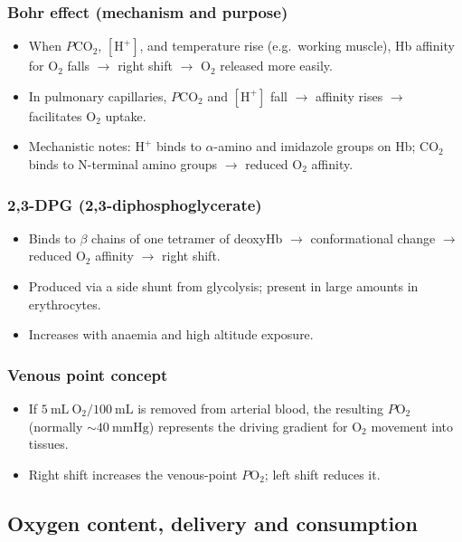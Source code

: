 \documentclass[11pt,a4paper]{article}
\begin{document}
\subsubsection{Bohr effect (mechanism and purpose)}
\begin{itemize}
  \item When \(P\mathrm{CO}_2\), \([\mathrm{H}^+]\), and temperature rise (e.g.\ working muscle), Hb affinity for O\(_2\) falls \(\rightarrow\) right shift \(\rightarrow\) O\(_2\) released more easily.
  \item In pulmonary capillaries, \(P\mathrm{CO}_2\) and \([\mathrm{H}^+]\) fall \(\rightarrow\) affinity rises \(\rightarrow\) facilitates O\(_2\) uptake.
  \item Mechanistic notes: \(\mathrm{H}^+\) binds to \(\alpha\)-amino and imidazole groups on Hb; CO\(_2\) binds to N-terminal amino groups \(\rightarrow\) reduced O\(_2\) affinity.
\end{itemize}

\subsubsection{2,3-DPG (2,3-diphosphoglycerate)}
\begin{itemize}
  \item Binds to \(\beta\) chains of one tetramer of deoxyHb \(\rightarrow\) conformational change \(\rightarrow\) reduced O\(_2\) affinity \(\rightarrow\) right shift.
  \item Produced via a side shunt from glycolysis; present in large amounts in erythrocytes.
  \item Increases with anaemia and high altitude exposure.
\end{itemize}

\subsubsection{Venous point concept}
\begin{itemize}
  \item If \(5~\mathrm{mL~O_2}/100~\mathrm{mL}\) is removed from arterial blood, the resulting \(P\mathrm{O}_2\) (normally \(\sim 40~\mathrm{mmHg}\)) represents the driving gradient for O\(_2\) movement into tissues.
  \item Right shift increases the venous-point \(P\mathrm{O}_2\); left shift reduces it.
\end{itemize}

\subsection{Oxygen content, delivery and consumption}
\end{document}
